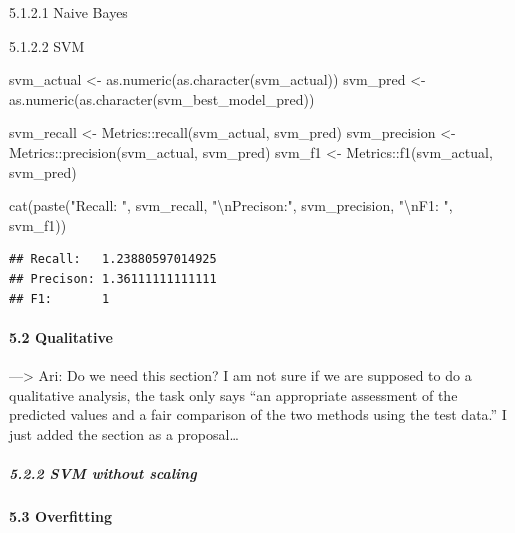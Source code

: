 \documentclass[
]{article}
\newenvironment{Shaded}{\begin{snugshade}}{\end{snugshade}}
\newcommand{\FunctionTok}[1]{\textcolor[rgb]{0.00,0.00,0.00}{#1}}
\newcommand{\NormalTok}[1]{#1}
\newcommand{\OtherTok}[1]{\textcolor[rgb]{0.56,0.35,0.01}{#1}}
\newcommand{\SpecialCharTok}[1]{\textcolor[rgb]{0.00,0.00,0.00}{#1}}
\newcommand{\StringTok}[1]{\textcolor[rgb]{0.31,0.60,0.02}{#1}}
\begin{document}
5.1.2.1 Naive Bayes

5.1.2.2 SVM

\begin{Shaded}
\begin{Highlighting}[]
\NormalTok{svm\_actual }\OtherTok{\textless{}{-}} \FunctionTok{as.numeric}\NormalTok{(}\FunctionTok{as.character}\NormalTok{(svm\_actual))}
\NormalTok{svm\_pred }\OtherTok{\textless{}{-}} \FunctionTok{as.numeric}\NormalTok{(}\FunctionTok{as.character}\NormalTok{(svm\_best\_model\_pred))}

\NormalTok{svm\_recall }\OtherTok{\textless{}{-}}\NormalTok{ Metrics}\SpecialCharTok{::}\FunctionTok{recall}\NormalTok{(svm\_actual, svm\_pred)}
\NormalTok{svm\_precision }\OtherTok{\textless{}{-}}\NormalTok{ Metrics}\SpecialCharTok{::}\FunctionTok{precision}\NormalTok{(svm\_actual, svm\_pred)}
\NormalTok{svm\_f1 }\OtherTok{\textless{}{-}}\NormalTok{ Metrics}\SpecialCharTok{::}\FunctionTok{f1}\NormalTok{(svm\_actual, svm\_pred)}

\FunctionTok{cat}\NormalTok{(}\FunctionTok{paste}\NormalTok{(}\StringTok{"Recall:  "}\NormalTok{, svm\_recall, }\StringTok{"}\SpecialCharTok{\textbackslash{}n}\StringTok{Precison:"}\NormalTok{, svm\_precision, }\StringTok{"}\SpecialCharTok{\textbackslash{}n}\StringTok{F1:      "}\NormalTok{, svm\_f1))}
\end{Highlighting}
\end{Shaded}

\begin{verbatim}
## Recall:   1.23880597014925 
## Precison: 1.36111111111111 
## F1:       1
\end{verbatim}

\hypertarget{qualitative}{%
\paragraph{5.2 Qualitative}\label{qualitative}}

---\textgreater{} Ari: Do we need this section? I am not sure if we are
supposed to do a qualitative analysis, the task only says ``an
appropriate assessment of the predicted values and a fair comparison of
the two methods using the test data.'' I just added the section as a
proposal\ldots{}

\hypertarget{svm-without-scaling}{%
\subparagraph{5.2.2 SVM without scaling}\label{svm-without-scaling}}

\hypertarget{overfitting}{%
\paragraph{5.3 Overfitting}\label{overfitting}}
\end{document}

